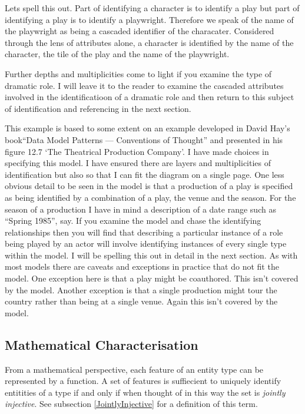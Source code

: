 Lets spell this out. Part of identifying a character is to identify a play but part of identifying a play is to identify a playwright. Therefore we speak of the name of the playwright as being a cascaded identifier of the characater. Considered through the lens of attributes alone, a character is identified by the name of the character, the tile of the play and the name of the playwright. 

Further depths and multiplicities come to light if you examine the type of dramatic role. I will leave it to the reader to examine the cascaded attributes involved in the identificatioon of a dramatic role and then return to this subject of identification and referencing in the next section.

{This example is based to some extent on an example developed 
in David Hay's book``Data Model Patterns --- Conventions of Thought''
and presented in his figure 12.7 `The Theatrical Production Company'.
I have made choices in specifying this model.
I have ensured there are layers and multiplicities of identification but also so that I can fit the diagram on a single page. 
One less obvious detail to be seen in the model is that a production of a play is specified as 
being identified by a combination of a play, the venue and the season.
For the season of a production I have in mind a description of a date range such as  ``Spring 1985'', say. 
If you examine the model and chase the identifying relationships
then you will find that describing a particular instance of a role being played by an actor will involve identifying
instances of every single type within the model. I will be spelling this out in detail in the next section.
As with most models there are caveats and exceptions in practice that do not fit the model. 
One exception here is that a play might be coauthored. This isn't covered by the model.
Another exception is that a single production might tour the country rather than being at a single venue. Again this isn't covered by the model. }

\subsection {Mathematical Characterisation}
\mynote From a mathematical perspective, 
each feature of an entity type can be represented by a function. A set of features is suffiecient to uniquely identify entitities of a type if and only if when thought  of in this way the set is \textit{jointly injective}.   
See subsection \ref{JointlyInjective} for a definition of this term.

